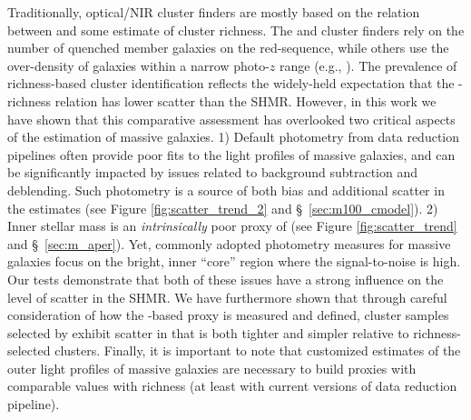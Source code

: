 \documentclass[fleqn,usenatbib,useAMS]{mnras}
\begin{document}
\begin{CJK*}{UTF8}{gbsn}
    Traditionally, optical/NIR cluster finders are mostly based on the relation between \mvir{} and
    some estimate of cluster richness.
    The \redm{} and \camira{} cluster finders rely on the number of quenched member galaxies on the
    red-sequence, while others use the over-density of galaxies within a narrow photo-$z$ range
    (e.g., \citealt{Wen2021, Zou2021}). 
    The prevalence of richness-based cluster identification reflects the widely-held expectation
    that the \mvir{}-richness relation has lower scatter than the SHMR.
    However, in this work we have shown that this comparative assessment has overlooked two critical
    aspects of the \mstar{} estimation of massive galaxies.
    1) Default photometry from data reduction pipelines often provide poor fits to the light 
    profiles of massive galaxies, and can be significantly impacted by issues related to background
    subtraction and deblending.
    Such photometry is a source of both bias and additional scatter in the \mstar{} estimates (see
    Figure \ref{fig:scatter_trend_2} and \S\ \ref{sec:m100_cmodel}). 
    2) Inner stellar mass is an {\em intrinsically} poor proxy of \mvir{} (see Figure
    \ref{fig:scatter_trend} and \S\ \ref{sec:m_aper}).
    Yet, commonly adopted photometry measures for massive galaxies focus on the bright, inner
    ``core'' region where the signal-to-noise is high. 
    Our \topn{} tests demonstrate that both of these issues have a strong influence on the level of
    scatter in the SHMR. 
    We have furthermore shown that through careful consideration of how the \mstar{}-based proxy is
    measured and defined, cluster samples selected by \mstar{} exhibit scatter in \mvir{} that is
    both tighter and simpler relative to richness-selected clusters. 
    Finally, it is important to note that customized estimates of the outer light profiles of
    massive galaxies are necessary to build \mvir{} proxies with comparable \sigmvir{} values with
    richness (at least with current versions of data reduction pipeline).
    

\end{CJK*}
\end{document}
